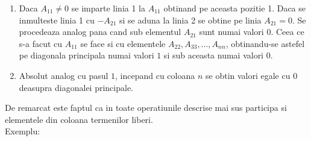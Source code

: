 \documentclass{article}
\begin{document}
        \begin{enumerate}
            \item Daca $A_{11}\neq 0$ se imparte linia 1 la $A_{11}$ obtinand pe aceasta pozitie 1. Daca se inmulteste linia 1 cu $-A_{21}$ si se aduna la linia 2 se obtine pe linia $A_{21} = 0$. Se procedeaza analog pana cand sub elementul $A_{21}$ sunt numai valori $0$. Ceea ce s-a facut cu $A_{11}$ se face si cu elementele $A_{22}, A_{33}, \dots ,A_{nn}$, obtinandu-se astefel pe diagonala principala numai valori $1$ si sub aceasta numai valori $0$.
            \item Absolut analog cu pasul $1$, incepand cu coloana $n$ se obtin valori egale cu $0$ deasupra diagonalei principale.
        \end{enumerate}
        De remarcat este faptul ca in toate operatiunile descrise mai sus participa si elementele din coloana termenilor liberi. \\
		Exemplu: \\
\end{document}
